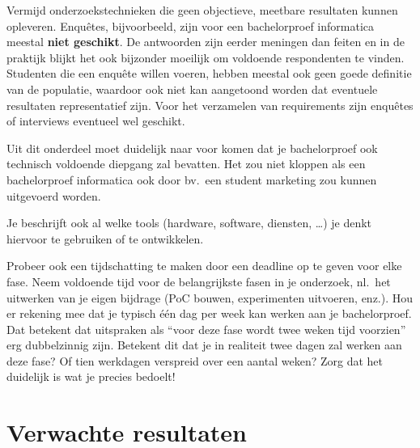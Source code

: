 \documentclass{hogent-article}
\begin{document}
Vermijd onderzoekstechnieken die geen objectieve, meetbare resultaten kunnen opleveren. Enquêtes, bijvoorbeeld, zijn voor een bachelorproef informatica meestal \textbf{niet geschikt}. De antwoorden zijn eerder meningen dan feiten en in de praktijk blijkt het ook bijzonder moeilijk om voldoende respondenten te vinden. Studenten die een enquête willen voeren, hebben meestal ook geen goede definitie van de populatie, waardoor ook niet kan aangetoond worden dat eventuele resultaten representatief zijn. Voor het verzamelen van requirements zijn enquêtes of interviews eventueel wel geschikt.

Uit dit onderdeel moet duidelijk naar voor komen dat je bachelorproef ook technisch voldoen\-de diepgang zal bevatten. Het zou niet kloppen als een bachelorproef informatica ook door bv.\ een student marketing zou kunnen uitgevoerd worden.

Je beschrijft ook al welke tools (hardware, software, diensten, \ldots) je denkt hiervoor te gebruiken of te ontwikkelen.

Probeer ook een tijdschatting te maken door een deadline op te geven voor elke fase. Neem voldoende tijd voor de belangrijkste fasen in je onderzoek, nl.\ het uitwerken van je eigen bijdrage (PoC bouwen, experimenten uitvoeren, enz.). Hou er rekening mee dat je typisch één dag per week kan werken aan je bachelorproef. Dat betekent dat uitspraken als ``voor deze fase wordt twee weken tijd voorzien'' erg dubbelzinnig zijn. Betekent dit dat je in realiteit twee dagen zal werken aan deze fase? Of tien werkdagen verspreid over een aantal weken? Zorg dat het duidelijk is wat je precies bedoelt!

%
%
%

\section{Verwachte resultaten}%
\label{sec:verwachte-resultaten}
\end{document}
